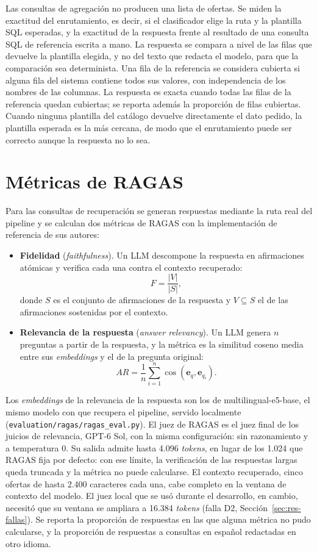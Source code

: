 Las consultas de agregación no producen una lista de ofertas. Se miden la exactitud del enrutamiento, es decir, si el clasificador elige la ruta y la plantilla SQL esperadas, y la exactitud de la respuesta frente al resultado de una consulta SQL de referencia escrita a mano. La respuesta se compara a nivel de las filas que devuelve la plantilla elegida, y no del texto que redacta el modelo, para que la comparación sea determinista. Una fila de la referencia se considera cubierta si alguna fila del sistema contiene todos sus valores, con independencia de los nombres de las columnas. La respuesta es exacta cuando todas las filas de la referencia quedan cubiertas; se reporta además la proporción de filas cubiertas. Cuando ninguna plantilla del catálogo devuelve directamente el dato pedido, la plantilla esperada es la más cercana, de modo que el enrutamiento puede ser correcto aunque la respuesta no lo sea.

\section{Métricas de RAGAS}
\label{anx:ragas}

Para las consultas de recuperación se generan respuestas mediante la ruta real del pipeline y se calculan dos métricas de RAGAS \citep{Es2024} con la implementación de referencia de sus autores:
\begin{itemize}
    \item \textbf{Fidelidad} (\textit{faithfulness}). Un LLM descompone la respuesta en afirmaciones atómicas y verifica cada una contra el contexto recuperado:
    \[
    F = \frac{|V|}{|S|},
    \]
    donde $S$ es el conjunto de afirmaciones de la respuesta y $V \subseteq S$ el de las afirmaciones sostenidas por el contexto.
    \item \textbf{Relevancia de la respuesta} (\textit{answer relevancy}). Un LLM genera $n$ preguntas a partir de la respuesta, y la métrica es la similitud coseno media entre sus \textit{embeddings} y el de la pregunta original:
    \[
    AR = \frac{1}{n}\sum_{i=1}^{n} \cos(\mathbf{e}_q, \mathbf{e}_{q_i}).
    \]
\end{itemize}
Los \textit{embeddings} de la relevancia de la respuesta son los de multilingual-e5-base, el mismo modelo con que recupera el pipeline, servido localmente (\texttt{evaluation/ragas/ragas\_eval.py}). El juez de RAGAS es el juez final de los juicios de relevancia, GPT-6 Sol, con la misma configuración: sin razonamiento y a temperatura 0. Su salida admite hasta 4.096 \textit{tokens}, en lugar de los 1.024 que RAGAS fija por defecto: con ese límite, la verificación de las respuestas largas queda truncada y la métrica no puede calcularse. El contexto recuperado, cinco ofertas de hasta 2.400 caracteres cada una, cabe completo en la ventana de contexto del modelo. El juez local que se usó durante el desarrollo, en cambio, necesitó que su ventana se ampliara a 16.384 \textit{tokens} (falla D2, Sección~\ref{sec:res-fallas}). Se reporta la proporción de respuestas en las que alguna métrica no pudo calcularse, y la proporción de respuestas a consultas en español redactadas en otro idioma.

